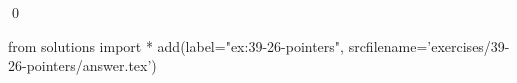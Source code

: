 
\begin{ex}
  \label{ex:39-26-pointers}
  
  \qed
\end{ex}
\begin{python0}
from solutions import *
add(label="ex:39-26-pointers",
    srcfilename='exercises/39-26-pointers/answer.tex')
\end{python0}
